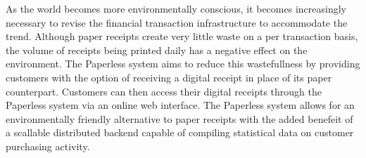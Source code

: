 As the world becomes more environmentally conscious, it becomes increasingly necessary to revise the financial transaction infrastructure to accommodate the trend.  Although paper receipts create very little waste on a per transaction basis, the volume of receipts being printed daily has a negative effect on the environment.  The Paperless system aims to reduce this wastefullness by providing customers with the option of receiving a digital receipt in place of its paper counterpart.  Customers can then access their digital receipts through the Paperless system via an online web interface.  The Paperless system allows for an environmentally friendly alternative to paper receipts with the added benefeit of a scallable distributed backend capable of compiling statistical data on customer purchasing activity.
